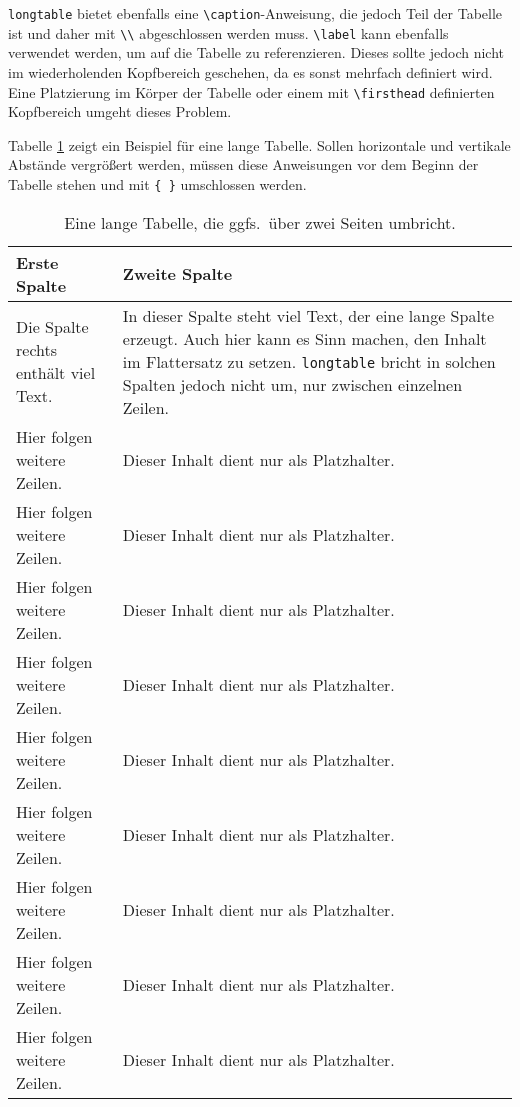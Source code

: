 \texttt{longtable} bietet ebenfalls eine \verb|\caption|-Anweisung, die
jedoch Teil der Tabelle ist und daher mit \verb|\\| abgeschlossen werden muss.
\verb|\label| kann ebenfalls verwendet werden, um auf die Tabelle zu
referenzieren. Dieses sollte jedoch nicht im wiederholenden Kopfbereich
geschehen, da es sonst mehrfach definiert wird. Eine Platzierung im Körper
der Tabelle oder einem mit \verb|\firsthead| definierten Kopfbereich umgeht
dieses Problem.

Tabelle \ref{tab:longtable} zeigt ein Beispiel für eine lange Tabelle. Sollen
horizontale und vertikale Abstände vergrößert werden, müssen diese
Anweisungen vor dem Beginn der Tabelle stehen und mit \verb|{ }| umschlossen
werden.

{\setlength{\tabcolsep}{10pt} %
\def\arraystretch{1.50}      %
\begin{longtable}{@{}lp{}@{}}
	\caption{Eine lange Tabelle, die ggfs.\ über zwei Seiten umbricht.} \\
	\toprule
	Erste Spalte & Zweite Spalte \\
	\midrule\endhead
	\label{tab:longtable}
	Die Spalte rechts enthält viel Text. &
	In dieser Spalte steht viel Text, der eine lange Spalte
	erzeugt. Auch hier kann es Sinn machen, den Inhalt im Flattersatz zu
	setzen. \texttt{longtable} bricht in solchen Spalten jedoch nicht um,
	nur zwischen einzelnen Zeilen. \\
	Hier folgen weitere Zeilen. & Dieser Inhalt dient nur als Platzhalter. \\
	Hier folgen weitere Zeilen. & Dieser Inhalt dient nur als Platzhalter. \\
	Hier folgen weitere Zeilen. & Dieser Inhalt dient nur als Platzhalter. \\
	Hier folgen weitere Zeilen. & Dieser Inhalt dient nur als Platzhalter. \\
	Hier folgen weitere Zeilen. & Dieser Inhalt dient nur als Platzhalter. \\
	Hier folgen weitere Zeilen. & Dieser Inhalt dient nur als Platzhalter. \\
	Hier folgen weitere Zeilen. & Dieser Inhalt dient nur als Platzhalter. \\
	Hier folgen weitere Zeilen. & Dieser Inhalt dient nur als Platzhalter. \\
	Hier folgen weitere Zeilen. & Dieser Inhalt dient nur als Platzhalter. \\
	\bottomrule
\end{longtable}}

